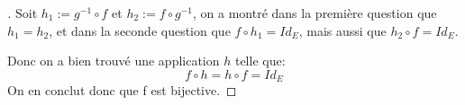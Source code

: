 \subsubsection*{}
\begin{proof}[\unskip\nopunct]
   Soit \(h_1 := g^{-1} \circ f\) et \(h_2 := f \circ g^{-1}\), on a montré dans la première question que \(h_1 = h_2\), et dans la seconde question que \(f \circ h_1 = Id_E\), mais aussi que \(h_2 \circ f = Id_E\).\<
   
   Donc on a bien trouvé une application \(h\) telle que:
   \[
      f \circ h = h \circ f = Id_E
   \]
   On en conclut donc que f est bijective.
\end{proof}
